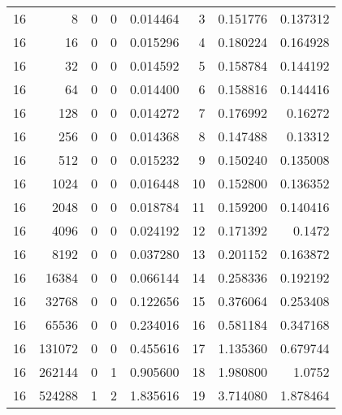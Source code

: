 \begin{longtable}[c]{@{}rrrrrrrr@{}}
    16        & 8         & 0         & 0        & 0.014464    & 3                   & 0.151776    & 0.137312   \\
    16        & 16        & 0         & 0        & 0.015296    & 4                   & 0.180224    & 0.164928   \\
    16        & 32        & 0         & 0        & 0.014592    & 5                   & 0.158784    & 0.144192   \\
    16        & 64        & 0         & 0        & 0.014400    & 6                   & 0.158816    & 0.144416   \\
    16        & 128       & 0         & 0        & 0.014272    & 7                   & 0.176992    & 0.16272    \\
    16        & 256       & 0         & 0        & 0.014368    & 8                   & 0.147488    & 0.13312    \\
    16        & 512       & 0         & 0        & 0.015232    & 9                   & 0.150240    & 0.135008   \\
    16        & 1024      & 0         & 0        & 0.016448    & 10                  & 0.152800    & 0.136352   \\
    16        & 2048      & 0         & 0        & 0.018784    & 11                  & 0.159200    & 0.140416   \\
    16        & 4096      & 0         & 0        & 0.024192    & 12                  & 0.171392    & 0.1472     \\
    16        & 8192      & 0         & 0        & 0.037280    & 13                  & 0.201152    & 0.163872   \\
    16        & 16384     & 0         & 0        & 0.066144    & 14                  & 0.258336    & 0.192192   \\
    16        & 32768     & 0         & 0        & 0.122656    & 15                  & 0.376064    & 0.253408   \\
    16        & 65536     & 0         & 0        & 0.234016    & 16                  & 0.581184    & 0.347168   \\
    16        & 131072    & 0         & 0        & 0.455616    & 17                  & 1.135360    & 0.679744   \\
    16        & 262144    & 0         & 1        & 0.905600    & 18                  & 1.980800    & 1.0752     \\
    16        & 524288    & 1         & 2        & 1.835616    & 19                  & 3.714080    & 1.878464   \\

\end{longtable}
